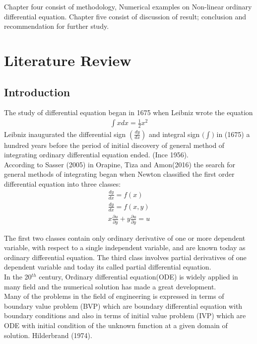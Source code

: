 \documentclass[11pt]{report}
\newcommand{\sps}{\\[0.2cm]}
\newcommand{\dsp}{\displaystyle}
\newcommand{\NI}{\noindent}
\begin{document}
	\NI Chapter four consist of methodology, Numerical examples on Non-linear ordinary differential equation. Chapter five consist of discussion of result; conclusion and recommendation for further study.
	

	
	\chapter{Literature Review}
	\section{Introduction}
	The study of differential equation began in 1675 when Leibniz wrote the equation
	\begin{eqnarray}
		\int x dx = \frac{1}{2}x^2
	\end{eqnarray}
	Leibniz inaugurated the differential sign $\dsp\left(\frac{dy}{dx}\right)$ and integral sign $\dsp\Big(\int\Big)$ in (1675) a hundred years before the period of initial discovery of general method of integrating ordinary differential equation ended. (Ince 1956).\\
	
	\NI According to Sasser (2005) in Orapine, Tiza and Amon(2016) the search for general methods of integrating began when Newton classified the first order differential equation into three classes:
	\begin{gather}
		\frac{dy}{dx} = f(x)\sps
		\frac{dy}{dx} = f(x,y)\sps
		x\frac{\partial u}{\partial y}+ y\frac{\partial u}{\partial y} = u
	\end{gather}
	
	\NI The first two classes contain only ordinary derivative of one or more dependent variable, with respect to a single independent variable, and are known today as ordinary differential equation. The third class involves partial derivatives of one dependent variable and today its called partial differential equation.\\
	
	\NI In the 20$^{th}$ century, Ordinary differential equation(ODE) is widely applied in many field and the numerical solution has made a great development.\\
	
	\NI Many of the problems in the field of engineering is expressed in terms of boundary value problem (BVP) which are boundary differential equation with boundary conditions and also in terms of initial value problem (IVP) which are ODE with initial condition of the unknown function at a given domain of solution. Hilderbrand (1974).\\
	
\end{document}
